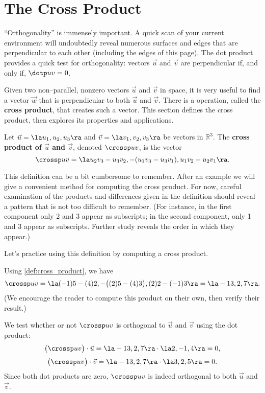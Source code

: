\section{The Cross Product}\label{sec:cross_product}

``Orthogonality'' is immensely important. A quick scan of your current environment will undoubtedly reveal numerous surfaces and edges that are perpendicular to each other (including the edges of this page). The dot product provides a quick test for orthogonality:  vectors $\vec u$ and $\vec v$ are perpendicular if, and only if, $\dotp uv=0$. 

Given two non--parallel, nonzero vectors $\vec u$ and $\vec v$ in space, it is very useful to find a vector $\vec w$ that is perpendicular to both $\vec u$ and $\vec v$. There is a operation, called the \textbf{cross product}, that creates such a vector. This section defines the cross product, then explores its properties and applications.

{Let $\vec u =\la u_1,u_2,u_3\ra$ and $\vec v = \la v_1,v_2,v_3\ra$ be vectors in $\mathbb{R}^3$. The \textbf{cross product of $\vec u$ and $\vec v$}, denoted $\crossp uv$, is the vector
$$\crossp uv = \la u_2v_3-u_3v_2,-(u_1v_3-u_3v_1),u_1v_2-u_2v_1\ra.$$}

This definition can be a bit cumbersome to remember. After an example we will give a convenient method for computing the cross product. For now, careful examination of the products and differences given in the definition should reveal a pattern that is not too difficult to remember. (For instance, in the first component only 2 and 3 appear as subscripts; in the second component, only 1 and 3 appear as subscripts. Further study reveals the order in which they appear.)

Let's practice using this definition by computing a cross product.

{Using \autoref{def:cross_product}, we have
$$\crossp uv = \la (-1)5-(4)2,-\big((2)5-(4)3\big), (2)2-(-1)3\ra = \la -13,2,7\ra.$$ 
(We encourage the reader to compute this product on their own, then verify their result.)

We test whether or not $\crossp uv$ is orthogonal to $\vec u$ and $\vec v$ using the dot product:
$$\big(\crossp uv\big) \cdot \vec u = \la -13,2,7\ra \cdot \la 2,-1,4\ra = 0,$$
$$\big(\crossp uv\big) \cdot \vec v = \la -13,2,7\ra \cdot \la 3,2,5 \ra = 0.$$
Since both dot products are zero, $\crossp uv$ is indeed orthogonal to both $\vec u$ and $\vec v$.}

